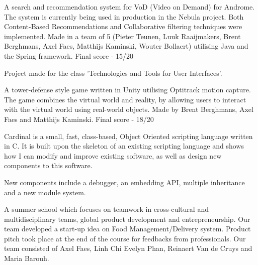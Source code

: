 \begin{cventries}
{\begin{cvitems}\item A search and recommendation system for VoD (Video on Demand) for Androme. The system is currently being used in production in the Nebula project. Both Content-Based Recommendations and Collaborative filtering techniques were implemented. Made in a team of 5 (Pieter Teunen, Luuk Raaijmakers, Brent Berghmans, Axel Faes, Matthijs Kaminski, Wouter Bollaert) utilising Java and the Spring framework. Final score - 15/20
\end{cvitems}
}

{\begin{cvitems}\item Project made for the class 'Technologies and Tools for User Interfaces'.
\item A tower-defense style game written in Unity utilising Optitrack motion capture. The game combines the virtual world and reality, by allowing users to interact with the virtual world using real-world objects. Made by Brent Berghmans, Axel Faes and Matthijs Kaminski. Final score - 18/20
\end{cvitems}
}

{\begin{cvitems}\item Cardinal is a small, fast, class-based, Object Oriented scripting language written in C. It is built upon the skeleton of an existing scripting language and shows how I can modify and improve existing software, as well as design new components to this software.
\item New components include a debugger, an embedding API, multiple inheritance and a new module system.
\end{cvitems}
}

{\begin{cvitems}\item A summer school which focuses on teamwork in cross-cultural and multidisciplinary teams, global product development and entrepreneurship. Our team developed a start-up idea on Food Management/Delivery system. Product pitch took place at the end of the course for feedbacks from professionals. Our team consisted of Axel Faes, Linh Chi Evelyn Phan, Reinaert Van de Cruys and Maria Barouh.
\end{cvitems}
}


\end{cventries}
